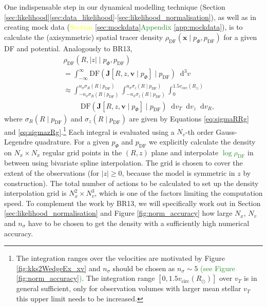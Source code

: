 \documentclass[iop,revtex4,numberedappendix,appendixfloats]{emulateapj}
\newcommand{\vect}[1]{\boldsymbol{#1}}
\newcommand*\diff{\mathop{}\!\mathrm{d}}
\newcommand*\Diff[1]{\mathop{}\!\mathrm{d^#1}}
\newcommand{\NEW}[1]{\textcolor{ForestGreen}{#1}}
\newcommand{\OLD}[1]{\textcolor{Yellow}{#1}}%
\begin{document}
One indispensable step in our dynamical modelling technique (Section \OLD{\ref{sec:likelihood}}\NEW{\ref{sec:data_likelihood}-\ref{sec:likelihood_normalisation}}), as well as in creating mock data (\OLD{Section \ref{sec:mockdata}}\NEW{Appendix \ref{app:mockdata}}), is to calculate the (axisymmetric) spatial tracer density $\rho_\text{DF}(\vect{x} \mid p_{\Phi},p_\text{DF})$ for a given DF and potential. Analogously to BR13, 
\begin{eqnarray}
&&\rho_\text{DF}(R,|z| \mid p_{\Phi},p_\text{DF}) \nonumber\\
&&= \int_{-\infty}^{\infty} \text{DF}(\vect{J}[R,z,\vect{v} \mid p_{\Phi}] \mid p_\text{DF}) \Diff3 v  \nonumber\\
&&\approx \int_{-n_\sigma \sigma_R(R \mid p_\text{DF})}^{n_\sigma \sigma_R(R \mid p_\text{DF})} \int_{-n_\sigma\sigma_z(R \mid p_\text{DF})}^{n_\sigma \sigma_z(R \mid p_\text{DF})} \int_{0}^{1.5 v_\text{circ}(R_\odot)}  \nonumber\\
& & \hspace{1cm} \text{DF}(\vect{J}[R,z,\vect{v} \mid p_{\Phi}] \mid p_\text{DF}) \diff v_T \diff v_z \diff v_R, \label{eq:tracerdensity}
\end{eqnarray}
where $\sigma_R(R \mid p_\text{DF})$ and $\sigma_z(R \mid p_\text{DF})$ are given by Equations \eqref{eq:sigmaRRg} and \eqref{eq:sigmazRg}.\footnote{The integration ranges over the velocities are motivated by Figure \ref{fig:kks2WedgeEx_xv} and $n_\sigma$ should be chosen as $n_\sigma \sim 5$ \NEW{(see Figure \ref{fig:norm_accuracy})}. The integration range $[0,1.5 v_\text{circ}(R_\odot)]$ over $v_T$ is in general sufficient, only for observation volumes with larger mean stellar $v_T$ this upper limit needs to be increased.} Each integral is evaluated using a $N_v$-th order Gauss-Legendre quadrature. For a given $p_\Phi$ and $p_\text{DF}$ we explicitly calculate the density on $N_x \times N_x$ regular grid points in the $(R,z)$ plane and interpolate \NEW{$\log \rho_\text{DF}$} in between using bivariate spline interpolation. The grid is chosen to cover the extent of the observations (for $|z|\geq0$, because the model is symmetric in $z$ by construction). The total number of actions to be calculated to set up the density interpolation grid is $N_x^2 \times N_v^3$, which is one of the factors limiting the computation speed. To complement the work by BR13, we will specifically work out in Section \ref{sec:likelihood_normalisation} and Figure \ref{fig:norm_accuracy} how large $N_x$, $N_v$ and $n_\sigma$ have to be chosen to get the density with a sufficiently high numerical accuracy. 
\end{document}
